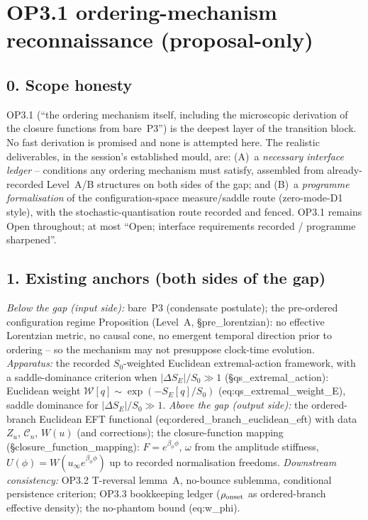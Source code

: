 \section*{OP3.1 ordering-mechanism reconnaissance (proposal-only)}

\subsection*{0. Scope honesty}
OP3.1 (``the ordering mechanism itself, including the microscopic
derivation of the closure functions from bare~P3'') is the deepest
layer of the transition block.
No fast derivation is promised and none is attempted here.
The realistic deliverables, in the session's established mould,
are: (A)~a \emph{necessary interface ledger} -- conditions any
ordering mechanism must satisfy, assembled from already-recorded
Level~A/B structures on both sides of the gap; and (B)~a
\emph{programme formalisation} of the configuration-space
measure/saddle route (zero-mode-D1 style), with the
stochastic-quantisation route recorded and fenced.
OP3.1 remains Open throughout; at most ``Open; interface
requirements recorded / programme sharpened''.

\subsection*{1. Existing anchors (both sides of the gap)}
\emph{Below the gap (input side):} bare~P3 (condensate postulate);
the pre-ordered configuration regime Proposition (Level~A,
\S pre\_lorentzian): no effective Lorentzian metric, no causal
cone, no emergent temporal direction prior to ordering -- so the
mechanism may not presuppose clock-time evolution.
\emph{Apparatus:} the recorded $S_0$-weighted Euclidean
extremal-action framework, with a saddle-dominance criterion when
$|\Delta S_E|/S_0\gg1$ (\S qs\_extremal\_action): Euclidean weight
$\mathcal W[q]\sim\exp(-S_E[q]/S_0)$
(eq:qs\_extremal\_weight\_E), saddle dominance for
$|\Delta S_E|/S_0\gg1$.
\emph{Above the gap (output side):} the ordered-branch Euclidean
EFT functional (eq:ordered\_branch\_euclidean\_eft) with data
$Z_u$, $\mathcal C_n$, $W(u)$ (and corrections); the
closure-function mapping (\S closure\_function\_mapping):
$F=e^{\beta_\phi\phi}$, $\omega$ from the amplitude stiffness,
$U(\phi)=W(u_\infty e^{\beta_\phi\phi})$ up to recorded
normalisation freedoms.
\emph{Downstream consistency:} OP3.2 T-reversal lemma~A,
no-bounce sublemma, conditional persistence criterion; OP3.3
bookkeeping ledger ($\rho_{\rm onset}$ as ordered-branch effective
density); the no-phantom bound (eq:w\_phi).

